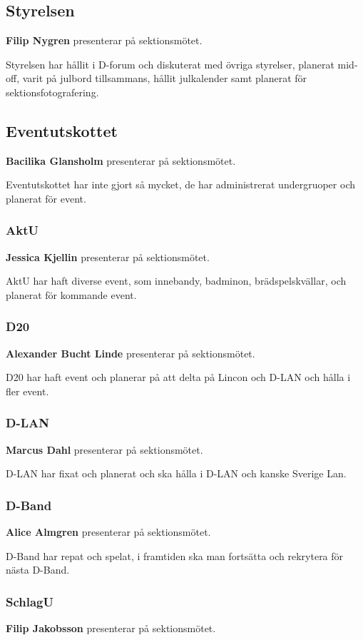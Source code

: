 \documentclass[../protokoll-vintermote-2024.tex]{subfiles}
\begin{document}
\subsection{Styrelsen}
\textbf{Filip Nygren} presenterar på sektionsmötet. 
 
Styrelsen har hållit i D-forum och diskuterat med övriga styrelser, planerat mid-off, varit på julbord tillsammans, hållit julkalender samt planerat för sektionsfotografering.

\subsection{Eventutskottet}
\textbf{Bacilika Glansholm} presenterar på sektionsmötet.

Eventutskottet har inte gjort så mycket, de har administrerat undergruoper och planerat för event.

\subsubsection{AktU}
\textbf{Jessica Kjellin} presenterar på sektionsmötet.

AktU har haft diverse event, som innebandy, badminon, brädspelskvällar, och planerat för kommande event.

\subsubsection{D20}
\textbf{Alexander Bucht Linde} presenterar på sektionsmötet. 

D20 har haft event och planerar på att delta på Lincon och D-LAN och hålla i fler event.

\subsubsection{D-LAN}
\textbf{Marcus Dahl} presenterar på sektionsmötet. 

D-LAN har fixat och planerat och ska hålla i D-LAN och kanske Sverige Lan.

\subsubsection{D-Band}
\textbf{Alice Almgren} presenterar på sektionsmötet. 

D-Band har repat och spelat, i framtiden ska man fortsätta och rekrytera för nästa D-Band.

\subsubsection{SchlagU}
\textbf{Filip Jakobsson} presenterar på sektionsmötet. 
\end{document}
